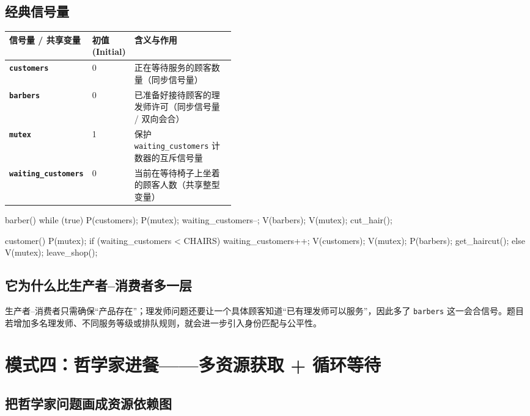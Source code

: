 \documentclass[11pt,a4paper]{ctexart}
\newcommand{\code}[1]{\texttt{#1}}
\begin{document}
\subsection{经典信号量}

\begingroup
\small
\renewcommand{\arraystretch}{1.25}
\setlength{\tabcolsep}{6pt}
\begin{tabularx}{\linewidth}{>{\bfseries}p{0.28\linewidth} p{0.15\linewidth} X}
\toprule
信号量 / 共享变量 & 初值 (Initial) & 含义与作用\\
\midrule
\code{customers} & 0 & 正在等待服务的顾客数量（同步信号量）\\
\code{barbers} & 0 & 已准备好接待顾客的理发师许可（同步信号量 / 双向会合）\\
\code{mutex} & 1 & 保护 \code{waiting\_customers} 计数器的互斥信号量\\
\code{waiting\_customers} & 0 & 当前在等待椅子上坐着的顾客人数（共享整型变量）\\
\bottomrule
\end{tabularx}
\endgroup

\begin{codeblock}
barber() {
    while (true) {
        P(customers);
        P(mutex);
        waiting_customers--;
        V(barbers);
        V(mutex);
        cut_hair();
    }
}

customer() {
    P(mutex);
    if (waiting_customers < CHAIRS) {
        waiting_customers++;
        V(customers);
        V(mutex);
        P(barbers);
        get_haircut();
    } else {
        V(mutex);
        leave_shop();
    }
}
\end{codeblock}

\subsection{它为什么比生产者--消费者多一层}

生产者--消费者只需确保“产品存在”；理发师问题还要让一个具体顾客知道“已有理发师可以服务”，因此多了 \code{barbers} 这一会合信号。题目若增加多名理发师、不同服务等级或排队规则，就会进一步引入身份匹配与公平性。

\section{模式四：哲学家进餐——多资源获取 + 循环等待}

\subsection{把哲学家问题画成资源依赖图}
\end{document}
